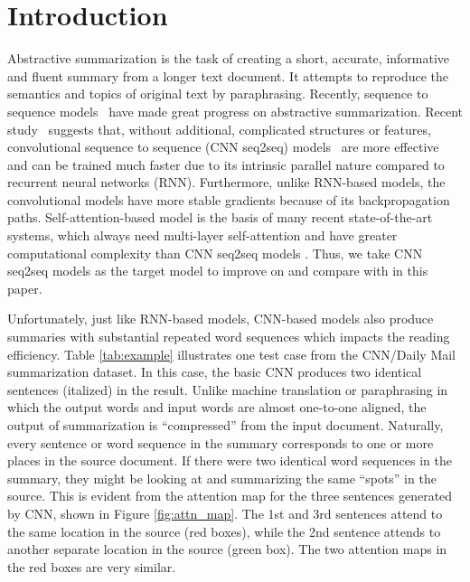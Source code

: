 \documentclass{nle}
\theoremstyle{definition}
\newcommand{\figref}[1]{Figure \ref{#1}}
\newcommand{\tabref}[1]{Table \ref{#1}}
\begin{document}
\maketitle
\section{Introduction}
\label{sec:intro}

Abstractive summarization is the task of creating a short, accurate,
informative and fluent summary from a longer text document.
It attempts to reproduce the semantics and topics of original text
by paraphrasing. 
Recently, sequence to sequence
models~\citep{RushCW15,ChopraAR16,NallapatiZSGX16,SeeLM17,PaulusXS17}
have made great progress on abstractive summarization.
Recent study~\citep{bai2018empirical} suggests that, 
without additional, complicated structures or features,
convolutional sequence to sequence 
(CNN seq2seq) models~\citep{gehring2017convs2s,FanGA18,LiuLZ18} 
are more effective and can be trained much faster due to 
its intrinsic parallel nature compared to recurrent neural networks (RNN).
Furthermore, unlike RNN-based models, 
the convolutional models have more stable gradients 
because of its backpropagation paths. 
Self-attention-based model is 
the basis of many recent state-of-the-art systems,
which always need multi-layer self-attention and have greater computational complexity than CNN seq2seq models \citep{CompareTrans}.
Thus, we take CNN seq2seq models as the target model to improve on and
compare with in this paper.

Unfortunately, just like RNN-based models, CNN-based models also produce
summaries with substantial repeated word sequences which impacts the reading efficiency.
\tabref{tab:example} illustrates one 
test case from the CNN/Daily Mail summarization dataset. 
In this case, the basic CNN produces two 
identical sentences (italized) in the result. 
Unlike machine translation or paraphrasing in which the output words
and input words are almost one-to-one aligned, the output of summarization
is ``compressed'' from the input document. Naturally, every sentence or 
word sequence in the summary corresponds to one or more places in the source
document. If there were two identical word sequences in the summary,
they might be looking at and summarizing the same ``spots'' in the source.
This is evident from the attention map for the three sentences generated by 
CNN, shown in \figref{fig:attn_map}. The 1st and 3rd sentences attend to
the same location in the source (red boxes), 
while the 2nd sentence attends to another separate location in the source (green box). 
The two attention maps in the red boxes are very similar.
\end{document}
